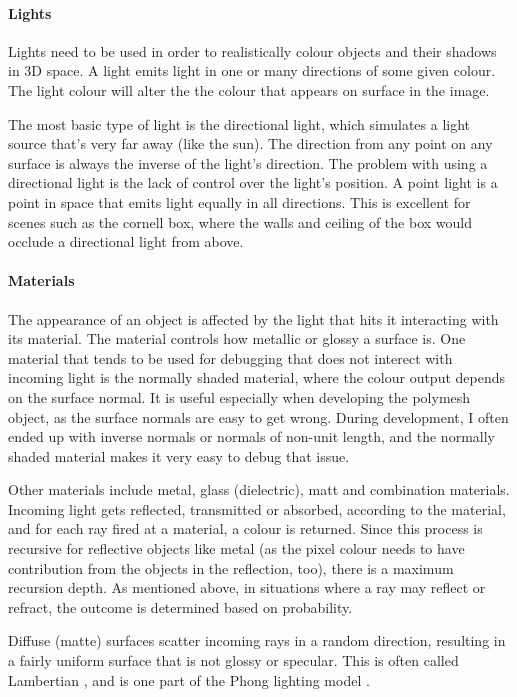 \documentclass[a4paper]{article}
\begin{document}
\paragraph{Lights}
Lights need to be used in order to realistically colour objects and their shadows in 3D space. A light emits light in one or many directions of some given colour. The light colour will alter the the colour that appears on surface in the image.

The most basic type of light is the directional light, which simulates a light source that's very far away (like the sun). The direction from any point on any surface is always the inverse of the light's direction. The problem with using a directional light is the lack of control over the light's position. A point light is a point in space that emits light equally in all directions. This is excellent for scenes such as the cornell box, where the walls and ceiling of the box would occlude a directional light from above.

\paragraph{Materials}
The appearance of an object is affected by the light that hits it interacting with its material. The material controls how metallic or glossy a surface is. One material that tends to be used for debugging that does not interect with incoming light is the normally shaded material, where the colour output depends on the surface normal. It is useful especially when developing the polymesh object, as the surface normals are easy to get wrong. During development, I often ended up with inverse normals or normals of non-unit length, and the normally shaded material makes it very easy to debug that issue.

Other materials include metal, glass (dielectric), matt and combination materials. Incoming light gets reflected, transmitted or absorbed, according to the material, and for each ray fired at a material, a colour is returned. Since this process is recursive for reflective objects like metal (as the pixel colour needs to have contribution from the objects in the reflection, too), there is a maximum recursion depth. As mentioned above, in situations where a ray may reflect or refract, the outcome is determined based on probability.

Diffuse (matte) surfaces scatter incoming rays in a random direction, resulting in a fairly uniform surface that is not glossy or specular. This is often called Lambertian \cite{}, and is one part of the Phong lighting model \cite{}.
\end{document}
